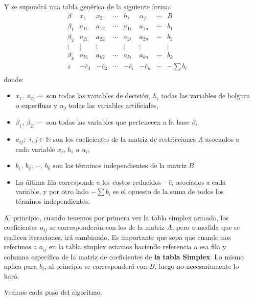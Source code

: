 Y se supondrá una tabla genérica de la siguiente forma:
\[
\begin{array}{c|cccccc|c}
\beta & x_1 & x_2 & \cdots & h_i & \alpha_j & \cdots & B \\
\hline
\beta_1 & a_{11} & a_{12} & \cdots & a_{1i} & a_{1n} & \cdots & b_1 \\
\beta_2 & a_{21} & a_{22} & \cdots & a_{2i} & a_{2n} & \cdots & b_2 \\
\vdots & \vdots & \vdots & & \vdots & \vdots & & \vdots \\
\beta_k & a_{k1} & a_{k2} & \cdots & a_{ki} & a_{kn} & \cdots & b_k \\
\hline
z & -\bar{c}_1 & -\bar{c}_2 & \cdots & -\bar{c}_i & -\bar{c}_n & \cdots & -\sum b_i \\
\end{array}
\]
donde:
\begin{itemize}
  \item \(x_1, \, x_2, \, \cdots ~\) son todas las variables de decisión, \(h_i\) todas las variables de holgura o superfluas y \(\alpha_j\) todas las variables artificiales,
  \item \(\beta_1, \, \beta_2, \, \cdots ~\) son todas las variables que pertenecen a la base \(\beta\),
  \item \(a_{ij}; ~~ i,j \in \mathbb{N}\) son los coeficientes de la matriz de restricciones \(A\) asociados a cada variable \(x_i,\, h_i\) o \(\alpha_i\),
  \item \(b_1,\, b_2,\, \cdots , \, b_k\) son los términos independientes de la matriz \(B\)
  \item La última fila corresponde a los costos reducidos \(-\bar{c}_i\) asociados a cada variable, y por otro lado \(-\sum b_i\) es el opuesto de la suma de todos los términos independientes. 
\end{itemize}

\begin{tcolorbox}[danger_box, title=Atención]
  Al principio, cuando tenemos por primera vez la tabla simplex armada, los coeficientes \(a_{ij}\) se corresponderán con los de la matriz \(A\), pero a medida que se realicen iteraciones, irá cambiando. Es importante que sepa que cuando nos referimos a \(a_{ij}\) en la tabla simplex estamos haciendo referencia a esa fila y columna específica de la matriz de coeficientes de \textbf{la tabla Simplex}. Lo mismo aplica para \(b_i\), al principio se corresponderá con \(B\), luego no necesariamente lo hará.
\end{tcolorbox}
Veamos cada paso del algoritmo.

